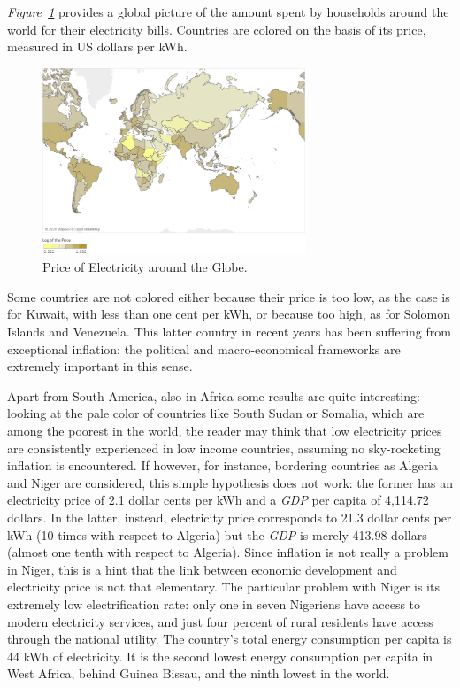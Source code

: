 \documentclass[a4paper,12pt]{book}
\begin{document}
\textit{Figure~\ref{fig:world_cost}} provides a global picture of the amount spent by households around the world for their electricity bills. Countries are colored on the basis of its price, measured in US dollars per kWh.

\begin{figure}[tb]
\begin{center}
\includegraphics[width=0.7\textwidth]{Images/world2020.png}
\end{center}
\captionsetup{justification=centering}
\caption{Price of Electricity around the Globe.}
\label{fig:world_cost}
\end{figure}

Some countries are not colored either because their price is too low, as the case is for Kuwait, with less than one cent per kWh, or because too high, as for Solomon Islands and Venezuela. This latter country in recent years has been suffering from exceptional inflation: the political and macro-economical frameworks are extremely important in this sense.

Apart from South America, also in Africa some results are quite interesting: looking at the pale color of countries like South Sudan or Somalia, which are among the poorest in the world, the reader may think that low electricity prices are consistently experienced in low income countries, assuming no sky-rocketing inflation is encountered. If however, for instance, bordering countries as Algeria and Niger are considered, this simple hypothesis does not work: the former has an electricity price of 2.1 dollar cents per kWh and a \textit{GDP} per capita of 4,114.72 dollars. In the latter, instead, electricity price corresponds to 21.3 dollar cents per kWh (10 times with respect to Algeria) but the \textit{GDP} is merely 413.98 dollars (almost one tenth with respect to Algeria). Since inflation is not really a problem in Niger, this is a hint that the link between economic development and electricity price is not that elementary. The particular problem with Niger is its extremely low electrification rate: only one in seven Nigeriens have access to modern electricity services, and just four percent of rural residents have access through the national utility. The country's total energy consumption per capita is 44 kWh of electricity. It is the second lowest energy consumption per capita in West Africa, behind Guinea Bissau, and the ninth lowest in the world. 
\end{document}
